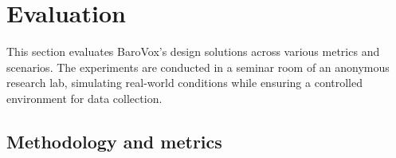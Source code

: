 
\section{Evaluation}
\label{sec:evaluation}

This section evaluates BaroVox's design solutions across various metrics and scenarios. The experiments are conducted in a seminar room of an anonymous research lab, simulating real-world conditions while ensuring a controlled environment for data collection.

\subsection{Methodology and metrics}

